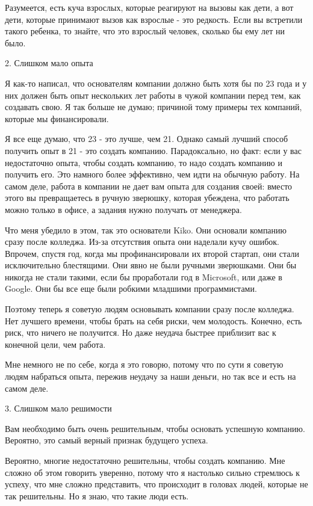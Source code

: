 \documentclass[ebook,12pt,oneside,openany]{memoir}
\begin{document}
Разумеется, есть куча взрослых, которые реагируют на вызовы как дети,
а вот дети, которые принимают вызов как взрослые - это редкость. Если
вы встретили такого ребенка, то знайте, что это взрослый человек,
сколько бы ему лет ни было.

2. Слишком мало опыта

Я как-то написал, что основателям компании должно быть хотя бы по 23
года и у них должен быть опыт нескольких лет работы в чужой компании
перед тем, как создавать свою. Я так больше не думаю; причиной тому
примеры тех компаний, которые мы финансировали.

Я все еще думаю, что 23 - это лучше, чем 21. Однако самый лучший
способ получить опыт в 21 - это создать компанию. Парадоксально, но
факт: если у вас недостаточно опыта, чтобы создать компанию, то надо
создать компанию и получить его. Это намного более эффективно, чем
идти на обычную работу. На самом деле, работа в компании не дает вам
опыта для создания своей: вместо этого вы превращаетесь в ручную
зверюшку, которая убеждена, что работать можно только в офисе, а
задания нужно получать от менеджера.

Что меня убедило в этом, так это основатели Kiko. Они основали
компанию сразу после колледжа. Из-за отсутствия опыта они наделали
кучу ошибок. Впрочем, спустя год, когда мы профинансировали их второй
стартап, они стали исключительно блестящими. Они явно не были ручными
зверюшками. Они бы никогда не стали такими, если бы проработали год в
Microsoft, или даже в Google. Они бы все еще были робкими младшими
программистами.

Поэтому теперь я советую людям основывать компании сразу после
колледжа. Нет лучшего времени, чтобы брать на себя риски, чем
молодость. Конечно, есть риск, что ничего не получится. Но даже
неудача быстрее приблизит вас к конечной цели, чем работа.

Мне немного не по себе, когда я это говорю, потому что по сути я
советую людям набраться опыта, пережив неудачу за наши деньги, но так
все и есть на самом деле.

3. Слишком мало решимости

Вам необходимо быть очень решительным, чтобы основать успешную
компанию. Вероятно, это самый верный признак будущего успеха.

Вероятно, многие недостаточно решительны, чтобы создать компанию. Мне
сложно об этом говорить уверенно, потому что я настолько сильно
стремлюсь к успеху, что мне сложно представить, что происходит в
головах людей, которые не так решительны. Но я знаю, что такие люди
есть.
\end{document}
